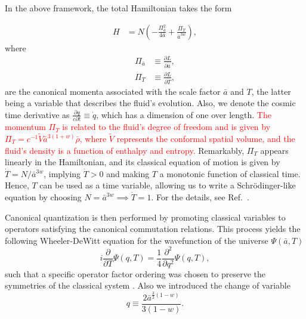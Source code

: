 \documentclass[a4paper,11pt]{article}
\newcommand{\dpar}[1]{\left(#1 \right)}
\begin{document}
In the above framework, the total Hamiltonian takes the form

\begin{align}
\label{total_hamiltonian_FLRW}
            H & = N\dpar{- \frac{\Pi_{\bar{a}}^{2} }{ 4\bar{a} } + \frac{\Pi_{T}}{\bar{a}^{3w}} } ,
        \end{align}
        where 
        \begin{align}
            \Pi_{\bar{a}} & \equiv \frac{ \partial L}{\partial \dot{\bar{a}}}
            ,\end{align}
        \begin{align}
            \Pi_T & \equiv \frac{ \partial L}{ \partial \dot{T}} 
        ,\end{align}
        are the canonical momenta associated with the scale factor $\bar{a}$ and $T$, 
        the latter being a variable that describes the fluid's evolution. Also, we denote the cosmic time derivative as $\frac{\partial q}{c\partial t} \equiv \dot{q}$, which has a dimension of one over length.
        \textcolor{red}{The momentum $\Pi_T$ is related to the fluid's degree of freedom and is given by $\Pi_T = c^{-1} \tilde{V} \bar{a}^{3(1 + w)} \bar{\rho}$, where $\tilde{V}$ represents the conformal spatial volume, and the fluid's density is a function of enthalpy and entropy.} Remarkably, $\Pi_T$ appears linearly in the Hamiltonian, and its classical equation of motion is given by
        $\dot{T} = { N }/{ \bar{a}^{3w} }$, implying $\dot{T} > 0$ and making $T$ a monotonic function of classical time. Hence, $T$ can be used as a time variable, allowing us to write a Schrödinger-like equation by choosing $N = \bar{a}^{3w} \implies \dot{T} = 1$. For the details, see Ref.~\cite{fluidgeral}. 
        
        Canonical quantization is then performed by promoting classical variables to operators satisfying the canonical commutation relations. This process yields the following Wheeler-DeWitt equation for the wavefunction of the universe  $\Psi(\bar{a}, T)$ \cite{nelson_peter_bouncing_original}
                \begin{equation}
                \label{wdweq}
            i\frac{\partial}{\partial T}\Psi(q,T) = \frac{1}{4}\frac{\partial^{2}}{\partial q^{2}}\Psi(q,T),
        \end{equation}
       such that a specific operator factor ordering was chosen to preserve the symmetries of the classical system \cite{halliwell1990introductory} . Also we introduced the change of variable
        \begin{equation}
            q \equiv \frac{2\bar{a}^{\frac{3}{2}\dpar{1-w} } }{ 3\dpar{1-w } }
        .\end{equation}
        
\end{document}
